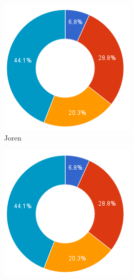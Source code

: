 \documentclass[i2]{oss}
\begin{document}
\begin{figure}[h!]
        \centering
        \begin{subfigure}[hb]{0.20\textwidth}
                \centering
                \includegraphics[width=\textwidth]{chart_2}
                \caption{Joren}
        \end{subfigure}%
        \begin{subfigure}[hb]{0.20\textwidth}
                \centering
                \includegraphics[width=\textwidth]{chart_3}

\end{subfigure}
\end{figure}
\end{document}
